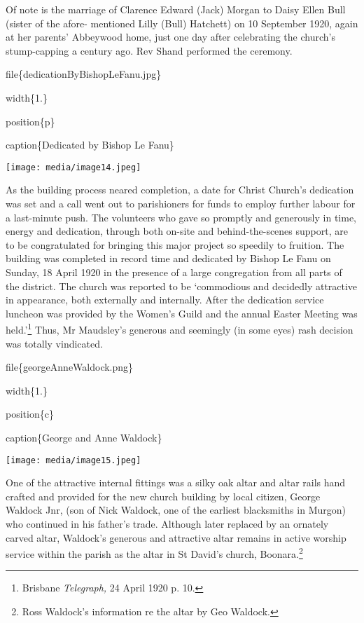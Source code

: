 Of note is the marriage of Clarence Edward (Jack) Morgan to Daisy Ellen Bull (sister of the afore- mentioned Lilly (Bull) Hatchett) on 10 September 1920, again at her parents' Abbeywood home, just one day after celebrating the church's stump-capping a century ago. Rev Shand performed the ceremony.

file\{dedicationByBishopLeFanu.jpg\}

width\{1.\}

position\{p\}

caption\{Dedicated by Bishop Le Fanu\}

\texttt{[image: media/image14.jpeg]}

As the building process neared completion, a date for Christ Church's dedication was set and a call went out to parishioners for funds to employ further labour for a last-minute push. The volunteers who gave so promptly and generously in time, energy and dedication, through both on-site and behind-the-scenes support, are to be congratulated for bringing this major project so speedily to fruition. The building was completed in record time and dedicated by Bishop Le Fanu on Sunday, 18 April 1920 in the presence of a large congregation from all parts of the district. The church was reported to be `commodious and decidedly attractive in appearance, both externally and internally. After the dedication service luncheon was provided by the Women's Guild and the annual Easter Meeting was held.'\footnote{Brisbane \emph{Telegraph,} 24 April 1920 p. 10.} Thus, Mr Maudsley's generous and seemingly (in some eyes) rash decision was totally vindicated.

file\{georgeAnneWaldock.png\}

width\{1.\}

position\{c\}

caption\{George and Anne Waldock\}

\texttt{[image: media/image15.jpeg]}

One of the attractive internal fittings was a silky oak altar and altar rails hand crafted and provided for the new church building by local citizen, George Waldock Jnr, (son of Nick Waldock, one of the earliest blacksmiths in Murgon) who continued in his father's trade. Although later replaced by an ornately carved altar, Waldock's generous and attractive altar remains in active worship service within the parish as the altar in St David's church, Boonara.\footnote{Ross Waldock's information re the altar by Geo Waldock.}

